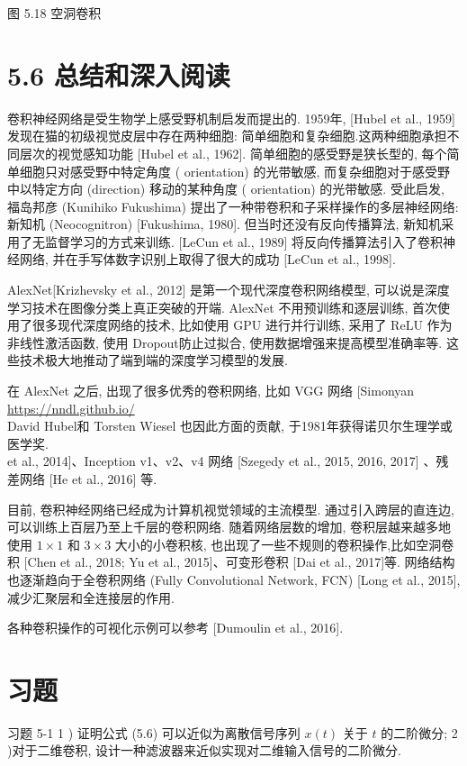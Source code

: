 \documentclass[10pt]{article}
\begin{document}
图 5.18 空洞卷积

\section*{5.6 总结和深入阅读}
卷积神经网络是受生物学上感受野机制启发而提出的. 1959年, [Hubel et al., 1959] 发现在猫的初级视觉皮层中存在两种细胞: 简单细胞和复杂细胞.这两种细胞承担不同层次的视觉感知功能 [Hubel et al., 1962]. 简单细胞的感受野是狭长型的, 每个简单细胞只对感受野中特定角度 ( orientation) 的光带敏感, 而复杂细胞对于感受野中以特定方向 (direction) 移动的某种角度 ( orientation) 的光带敏感. 受此启发, 福岛邦彦 (Kunihiko Fukushima) 提出了一种带卷积和子采样操作的多层神经网络: 新知机 (Neocognitron) [Fukushima, 1980]. 但当时还没有反向传播算法, 新知机采用了无监督学习的方式来训练. [LeCun et al., 1989] 将反向传播算法引入了卷积神经网络, 并在手写体数字识别上取得了很大的成功 [LeCun et al., 1998].

AlexNet[Krizhevsky et al., 2012] 是第一个现代深度卷积网络模型, 可以说是深度学习技术在图像分类上真正突破的开端. AlexNet 不用预训练和逐层训练, 首次使用了很多现代深度网络的技术, 比如使用 GPU 进行并行训练, 采用了 ReLU 作为非线性激活函数, 使用 Dropout防止过拟合, 使用数据增强来提高模型准确率等. 这些技术极大地推动了端到端的深度学习模型的发展.

在 AlexNet 之后, 出现了很多优秀的卷积网络, 比如 VGG 网络 [Simonyan \href{https://nndl.github.io/}{https://nndl.github.io/}\\
David Hubel和 Torsten Wiesel 也因此方面的贡献, 于1981年获得诺贝尔生理学或医学奖.\\
et al., 2014]、Inception v1、v2、v4 网络 [Szegedy et al., 2015, 2016, 2017] 、残差网络 [He et al., 2016] 等.

目前, 卷积神经网络已经成为计算机视觉领域的主流模型. 通过引入跨层的直连边, 可以训练上百层乃至上千层的卷积网络. 随着网络层数的增加, 卷积层越来越多地使用 $1 \times 1$ 和 $3 \times 3$ 大小的小卷积核, 也出现了一些不规则的卷积操作,比如空洞卷积 [Chen et al., 2018; Yu et al., 2015]、可变形卷积 [Dai et al., 2017]等. 网络结构也逐渐趋向于全卷积网络 (Fully Convolutional Network, FCN) [Long et al., 2015], 减少汇聚层和全连接层的作用.

各种卷积操作的可视化示例可以参考 [Dumoulin et al., 2016].

\section*{习题}
习题 5-1 1 ) 证明公式 (5.6) 可以近似为离散信号序列 $x(t)$ 关于 $t$ 的二阶微分; 2 )对于二维卷积, 设计一种滤波器来近似实现对二维输入信号的二阶微分.
\end{document}
